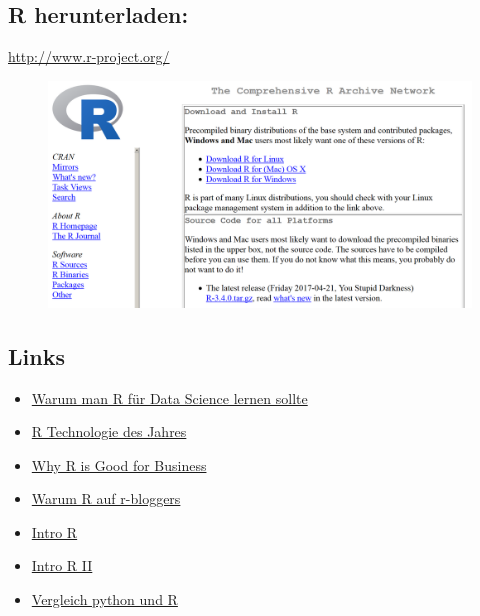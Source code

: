 \documentclass[]{article}
\begin{document}
\subsection{R herunterladen:}\label{r-herunterladen}

\url{http://www.r-project.org/}

\begin{figure}[htbp]
\centering
\includegraphics{figure/CRAN1picture.PNG}
\caption{}
\end{figure}

\subsection{Links}\label{links}

\begin{itemize}
\item
  \href{http://www.r-bloggers.com/why-you-should-learn-r-first-for-data-science/}{Warum
  man R für Data Science lernen sollte}
\item
  \href{http://www.r-bloggers.com/rstudio-infoworld-2015-technology-of-the-year-award-recipient/}{R
  Technologie des Jahres}
\item
  \href{http://www.fastcolabs.com/3030063/why-the-r-programming-language-is-good-for-business}{Why
  R is Good for Business}
\item
  \href{http://www.r-bloggers.com/why-use-r/}{Warum R auf r-bloggers}
\item
  \href{http://www.ats.ucla.edu/stat/r/seminars/intro.htm}{Intro R}
\item
  \href{http://www.ats.ucla.edu/stat/r/sk/}{Intro R II}
\item
  \href{http://www.dataschool.io/python-or-r-for-data-science/}{Vergleich
  python und R}
\end{itemize}
\end{document}
